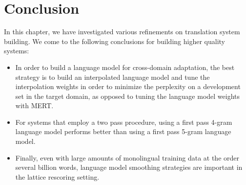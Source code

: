 \section{Conclusion}

In this chapter, we have investigated various refinements
on translation system building. We come to the following
conclusions for building higher quality systems:
%
\begin{itemize}
  \item In order to build a language model for cross-domain
    adaptation, the best strategy is to build an interpolated
    language model and tune the interpolation weights in order
    to minimize the perplexity on a development set in the
    target domain, as opposed to tuning the language model
    weights with MERT.
  \item For systems that employ a two pass procedure, using
    a first pass 4-gram language model performs better than
    using a first pass 5-gram language model.
  \item Finally, even with large amounts of monolingual training
    data at the order several billion words, language model smoothing
    strategies are important in the lattice rescoring setting.
\end{itemize}

